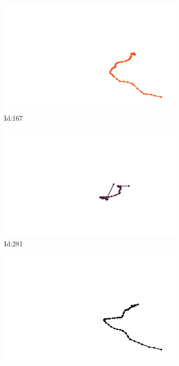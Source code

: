 \documentclass[12pt,twoside]{report}
\begin{document}
\begin{figure}
\centering
\begin{subfigure}[b]{0.20\textwidth}
\centering
\includegraphics[width=\textwidth]{../../trajectories/167.png}
\caption{Id:167}
\end{subfigure}
\begin{subfigure}[b]{0.20\textwidth}
\centering
\includegraphics[width=\textwidth]{../../trajectories/281.png}
\caption{Id:281}
\end{subfigure}
\begin{subfigure}[b]{0.20\textwidth}
\centering
\includegraphics[width=\textwidth]{../../trajectories/427.png}

\end{subfigure}
\end{figure}
\end{document}
